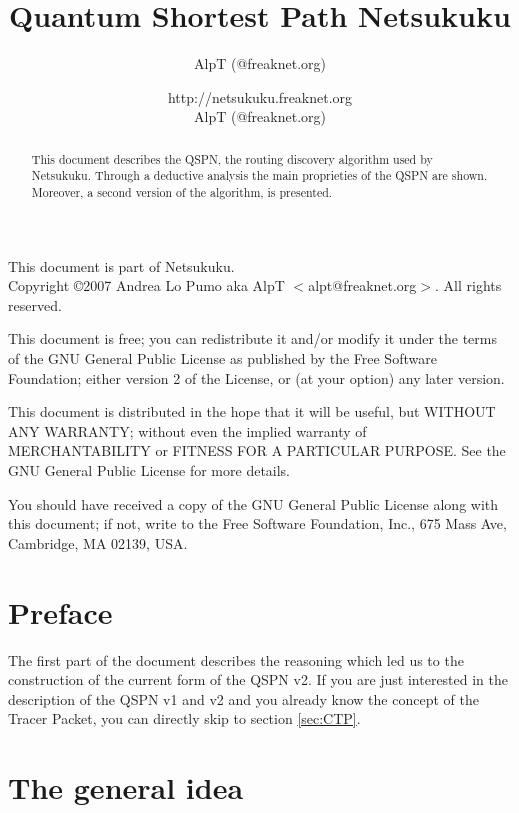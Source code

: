 \documentclass[a4paper]{article}
\title{Quantum Shortest Path Netsukuku}
\author{AlpT (@freaknet.org)}
\author{http://netsukuku.freaknet.org\\AlpT (@freaknet.org)}
\begin{document}
\maketitle

\begin{abstract}
	This document describes the QSPN, the routing discovery algorithm used
	by Netsukuku.
	Through a deductive analysis the main proprieties of the QSPN are
	shown. Moreover, a second version of the algorithm, is presented.
\end{abstract}
\pagebreak
\begin{small}
  This document is part of Netsukuku.\\
  Copyright \copyright 2007 Andrea Lo Pumo aka AlpT $<$alpt@freaknet.org$>$.
  All rights reserved.

  This document is free; you can redistribute it and/or modify it
  under the terms of the GNU General Public License as published by
  the Free Software Foundation; either version 2 of the License, or
  (at your option) any later version.

  This document is distributed in the hope that it will be useful, but
  WITHOUT ANY WARRANTY; without even the implied warranty of
  MERCHANTABILITY or FITNESS FOR A PARTICULAR PURPOSE\@.  See the GNU
  General Public License for more details.

  You should have received a copy of the GNU General Public License
  along with this document; if not, write to the Free Software
  Foundation, Inc., 675 Mass Ave, Cambridge, MA 02139, USA.
\end{small}

\clearpage
\tableofcontents
\clearpage
{}

\section{Preface}
\label{sec:preface}

The first part of the document describes the reasoning which led us to the
construction of the current form of the QSPN v2.
If you are just interested in the description of the QSPN v1 and v2 and you
already know the concept of the Tracer Packet, you can directly skip to
section \ref{sec:CTP}.

\section{The general idea}
\label{sec:general_idea}
\end{document}
